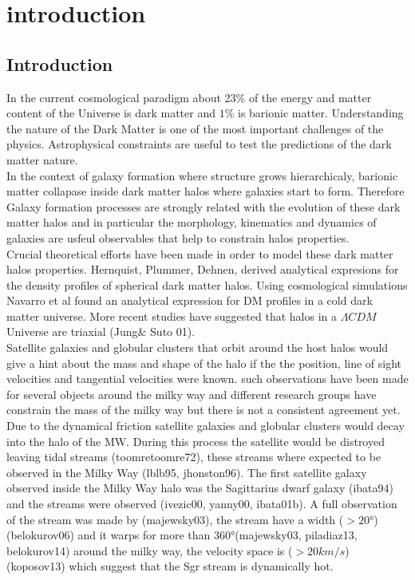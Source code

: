\chapter{introduction}\label{sec:intro}
\section{Introduction}

In the current cosmological paradigm about 23\% of the energy and matter
content of the Universe is dark matter and $1\%$ is barionic matter. Understanding 
the nature of the Dark Matter is one of the most important challenges of the
physics. Astrophysical constraints are useful to test the predictions
of the dark matter nature.\\

In the context of galaxy formation where structure grows hierarchicaly, barionic matter
collapase inside dark matter halos where galaxies start to form. Therefore
Galaxy formation processes are strongly related with the evolution of these dark matter halos
and in particular the morphology, kinematics and dynamics of galaxies 
are usfeul observables that help to constrain halos properties.\\

     
Crucial theoretical efforts have been made in order to model these dark matter halos 
properties. Hernquist, Plummer, Dehnen, derived analytical expresions for the density 
profiles of spherical dark matter halos. Using cosmological simulations Navarro et al 
found an analytical expression for DM profiles in a cold dark matter universe.
More recent studies have suggested that halos in a $\Lambda CDM$ Universe are 
triaxial (Jung\& Suto 01). \\


Satellite galaxies and globular clusters that orbit around the host halos would give 
a hint about the mass and shape of the halo if the the position, line of sight velocities and 
tangential velocities were known. such observations have been made for several objects 
around the milky way and different research groups have constrain the mass of the milky way 
but there is not a consistent agreement yet.\\

Due to the dynamical friction satellite galaxies and globular clusters would decay into 
the halo of the MW. During this process the satellite would be distroyed leaving 
tidal streams (toomretoomre72), these streams where expected to be observed 
in the Milky Way (lblb95, jhonston96). 
The first satellite galaxy observed inside the Milky Way halo was the Sagittarius dwarf 
galaxy (ibata94) and the streams were observed (ivezic00, yanny00, ibata01b). 
A full observation of the stream was made by (majewsky03), the stream  
have a width ($>20°$) (belokurov06) and it warps
for more than $360°$(majewsky03, piladiaz13, belokurov14) around the milky way, 
the velocity space is ($>20km/s$) (koposov13) which suggest that
the Sgr stream is dynamically hot.  \\

